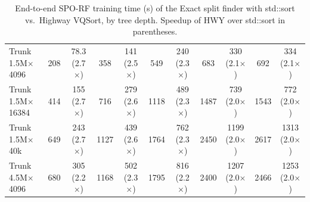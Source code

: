 \begin{table}[p]
\begin{tabular}{l|cc|cc|cc|cc|cc}
        Trunk 1.5M$\times$4096 & 208 & 78.3 (2.7$\times$) & 358 & 141 (2.5$\times$) & 549 & 240 (2.3$\times$) & 683 & 330 (2.1$\times$) & 692 & 334 (2.1$\times$) \\
        Trunk 1.5M$\times$16384 & 414 & 155 (2.7$\times$) & 716 & 279 (2.6$\times$) & 1118 & 489 (2.3$\times$) & 1487 & 739 (2.0$\times$) & 1543 & 772 (2.0$\times$) \\
        Trunk 1.5M$\times$40k & 649 & 243 (2.7$\times$) & 1127 & 439 (2.6$\times$) & 1764 & 762 (2.3$\times$) & 2450 & 1199 (2.0$\times$) & 2617 & 1313 (2.0$\times$) \\
        Trunk 4.5M$\times$4096 & 680 & 305 (2.2$\times$) & 1168 & 502 (2.3$\times$) & 1795 & 816 (2.2$\times$) & 2400 & 1207 (2.0$\times$) & 2466 & 1253 (2.0$\times$) \\
        \hline
    \end{tabular}
    \caption{End-to-end SPO-RF training time (s) of the Exact split finder with std::sort vs.\ Highway VQSort, by tree depth. Speedup of HWY over std::sort in parentheses.}
    \label{tab:train-time-exact-sort}
\end{table}
